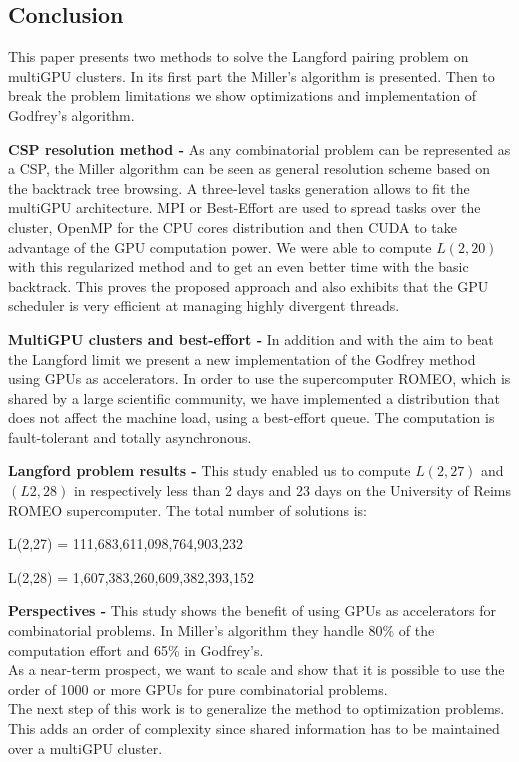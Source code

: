 \subsection{Conclusion}

This paper presents two methods to solve the Langford pairing problem on multiGPU clusters. 
In its first part the Miller's algorithm is presented. 
Then to break the problem limitations we show optimizations and implementation of Godfrey's algorithm.

\textbf{CSP resolution method -}
As any combinatorial problem can be represented as a CSP, the Miller algorithm can be seen as general resolution scheme based on the backtrack tree browsing. 
A three-level tasks generation allows to fit the multiGPU architecture. 
MPI or Best-Effort are used to spread tasks over the cluster, OpenMP for the CPU cores distribution and then CUDA to take advantage of the GPU computation power.
We were able to compute $L(2,20)$ with this regularized method and to get an even better time with the basic backtrack. 
This proves the proposed approach and also exhibits that the GPU scheduler is very efficient at managing highly divergent threads.

\textbf{MultiGPU clusters and best-effort -}
In addition and with the aim to beat the Langford limit we present a new implementation of the Godfrey method using GPUs as accelerators. In order to use the supercomputer ROMEO, which is shared by a large scientific community, we have implemented a distribution that does not affect the machine load, using a best-effort queue. The computation is fault-tolerant and totally asynchronous.

\textbf{Langford problem results -}
This study enabled us to compute $L(2,27)$ and $(L2,28)$ in respectively less than 2 days and 23 days on the University of Reims ROMEO supercomputer. The total number of solutions is: 

\hspace{3cm} L(2,27) = 111,683,611,098,764,903,232

\hspace{3cm} L(2,28) = 1,607,383,260,609,382,393,152

\textbf{Perspectives -}
This study shows the benefit of using GPUs as accelerators for combinatorial problems. 
In Miller's algorithm they handle 80\% of the computation effort and 65\% in Godfrey's.\\
As a near-term prospect, we want to scale and show that it is possible to use the order of 1000 or more GPUs for pure combinatorial problems.\\
The next step of this work is to generalize the method to optimization problems. This adds an order of complexity since shared information has to be maintained over a multiGPU cluster. 

